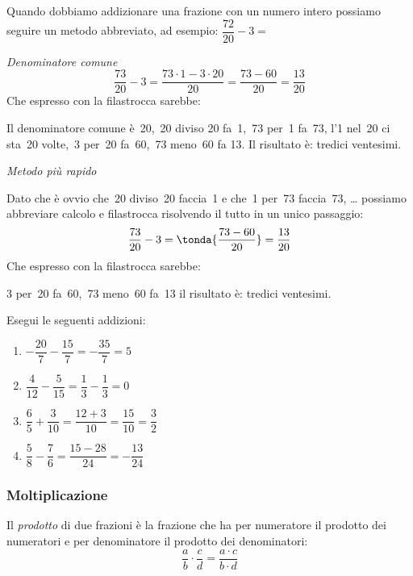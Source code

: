 \begin{esempio}
 Quando dobbiamo addizionare una frazione con un numero intero possiamo 
seguire un metodo abbreviato, ad esempio: 
\(\dfrac{72}{20} - 3 =\)

\emph{Denominatore comune}
\[\dfrac{73}{20} - 3 = \dfrac{73 \cdot 1 - 3 \cdot 20}{20} =
  \dfrac{73 - 60}{20} = \dfrac{13}{20}\]
Che espresso con la filastrocca sarebbe: 

Il denominatore comune è~20,~20 diviso 20 fa~1,~73 per~1 fa~73, 
l'1 nel~20 ci sta~20 volte,~3 per~20 fa~60,~73 meno~60 fa 13.
Il risultato è: tredici ventesimi.

\emph{Metodo più rapido}

Dato che è ovvio che~20 diviso~20 faccia~1 e che~1 per~73 faccia~73, \dots
possiamo abbreviare calcolo e filastrocca risolvendo il tutto in un unico 
passaggio:
\[\dfrac{73}{20} - 3 = \tonda{\dfrac{73 - 60}{20}} = \dfrac{13}{20}\]
Che espresso con la filastrocca sarebbe: 

3 per~20 fa~60,~73 meno~60 fa~13 il risultato è: tredici ventesimi.
\end{esempio}

\begin{esempio}
 Esegui le seguenti addizioni:
 \begin{multicols}{2}
 \begin{enumerate} [noitemsep]
  \item \(-\dfrac{20}{7} -\dfrac{15}{7} = -\dfrac{35}{7} = 5\)
  \item \(\dfrac{4}{12} - \dfrac{5}{15} = \dfrac{1}{3} - \dfrac{1}{3} = 0\)
  \item \(\dfrac{6}{5} + \dfrac{3}{10} = \dfrac{12 + 3}{10} = 
          \dfrac{15}{10} = \dfrac{3}{2}\)
  \item \(\dfrac{5}{8} - \dfrac{7}{6} = \dfrac{15 - 28}{24} = 
          -\dfrac{13}{24}\)
 \end{enumerate}
 \end{multicols}
\end{esempio}


\subsubsection{Moltiplicazione}

\begin{definizione}
 Il \emph{prodotto} di due frazioni è la frazione che ha per 
numeratore il prodotto dei numeratori e per denominatore il prodotto dei 
denominatori:
\[\dfrac{a}{b} \cdot \dfrac{c}{d} = \dfrac{a \cdot c}{b \cdot d}\]
\end{definizione}


